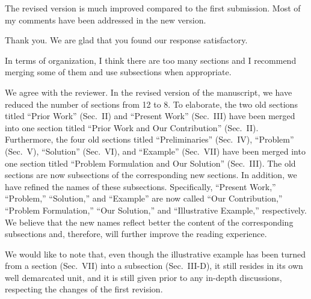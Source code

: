 \begin{reviewer}
The revised version is much improved compared to the first submission. Most of
my comments have been addressed in the new version.
\end{reviewer}

\begin{authors}
Thank you. We are glad that you found our response satisfactory.
\end{authors}

\begin{reviewer}
In terms of organization, I think there are too many sections and I recommend
merging some of them and use subsections when appropriate.
\end{reviewer}

\begin{authors}
We agree with the reviewer. In the revised version of the manuscript, we have
reduced the number of sections from 12 to 8. To elaborate, the two old sections
titled ``Prior Work'' (Sec.~II) and ``Present Work'' (Sec.~III) have been merged
into one section titled ``Prior Work and Our Contribution'' (Sec.~II).
Furthermore, the four old sections titled ``Preliminaries'' (Sec.~IV),
``Problem'' (Sec.~V), ``Solution'' (Sec.~VI), and ``Example'' (Sec.~VII) have
been merged into one section titled ``Problem Formulation and Our Solution''
(Sec.~III). The old sections are now subsections of the corresponding new
sections. In addition, we have refined the names of these subsections.
Specifically, ``Present Work,'' ``Problem,'' ``Solution,'' and ``Example'' are
now called ``Our Contribution,'' ``Problem Formulation,'' ``Our Solution,'' and
``Illustrative Example,'' respectively. We believe that the new names reflect
better the content of the corresponding subsections and, therefore, will further
improve the reading experience.

We would like to note that, even though the illustrative example has been turned
from a section (Sec.~VII) into a subsection (Sec.~III-D), it still resides in
its own well demarcated unit, and it is still given prior to any in-depth
discussions, respecting the changes of the first revision.

\begin{actions}

\end{actions}
\end{authors}

